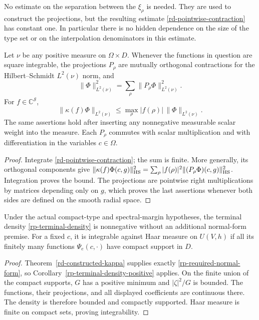 No estimate on the separation between the
$\xi_\rho$ is needed.  They are used to construct
the projections, but the resulting estimate
\eqref{rd-pointwise-contraction} has constant one.
In particular there is no hidden dependence on
the size of the type set or on the interpolation
denominators in this estimate.

\begin{corollary}\label{rd-integrated-projections}
Let $\nu$ be any positive measure on
$\Omega\times D$.  Whenever the functions in
question are square integrable, the projections
$P_\rho$ are mutually orthogonal contractions
for the Hilbert--Schmidt $L^2(\nu)$ norm, and
\[
 \|\Phi\|_{L^2(\nu)}^2
                  =\sum_\rho\|P_\rho\Phi\|_{L^2(\nu)}^2.
\]
For $f\in\mathbb C^{\mathcal S}$,
\[
 \|\kappa(f)\Phi\|_{L^2(\nu)}
              \leq \max_\rho|f(\rho)|\,\|\Phi\|_{L^2(\nu)}.
\]
The same assertions hold after inserting any
nonnegative measurable scalar weight into the
measure.  Each $P_\rho$ commutes with scalar
multiplication and with differentiation in
the variables $c\in\Omega$.
\end{corollary}

\begin{proof}
Integrate \eqref{rd-pointwise-contraction};
the sum is finite.  More generally, its
orthogonal components give
$\|\kappa(f)\Phi(c,g)\|_{\rm HS}^2
=\sum_\rho|f(\rho)|^2
\|(P_\rho\Phi)(c,g)\|_{\rm HS}^2$.
Integration proves the bound.
The projections are pointwise right
multiplications by matrices depending only
on $g$, which proves the last assertions
whenever both sides are defined on the
smooth radial space.
\end{proof}

\begin{corollary}\label{rd-actual-positive-density}
Under the actual compact-type and spectral-margin
hypotheses, the terminal density
\eqref{rp-terminal-density} is nonnegative
without an additional normal-form premise.
For a fixed $c$, it is integrable against Haar
measure on $U(V,h)$ if all its finitely many
functions $\Psi_e(c,\cdot)$ have compact
support in $D$.
\end{corollary}

\begin{proof}
Theorem~\ref{rd-constructed-kappa} supplies
exactly \eqref{rp-required-normal-form}, so
Corollary~\ref{rp-terminal-density-positive}
applies.  On the finite union of the compact
supports, $G$ has a positive minimum and
$|\zeta|^2/G$ is bounded.  The functions,
their projections, and all displayed
coefficients are continuous there.
The density is therefore bounded and
compactly supported.  Haar measure is
finite on compact sets, proving
integrability.
\end{proof}

